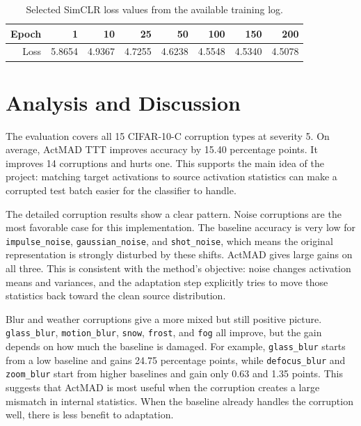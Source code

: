 \documentclass[a4paper,11pt]{article}
\begin{document}
\begin{table}[H]
\centering
\caption{Selected SimCLR loss values from the available training log.}
\begin{tabular}{rrrrrrrr}
\toprule
Epoch & 1 & 10 & 25 & 50 & 100 & 150 & 200\\
\midrule
Loss & 5.8654 & 4.9367 & 4.7255 & 4.6238 & 4.5548 & 4.5340 & 4.5078\\
\bottomrule
\end{tabular}
\end{table}

\section{Analysis and Discussion}

The evaluation covers all 15 CIFAR-10-C corruption types at severity 5. On average, ActMAD TTT improves accuracy by 15.40 percentage points. It improves 14 corruptions and hurts one. This supports the main idea of the project: matching target activations to source activation statistics can make a corrupted test batch easier for the classifier to handle.

The detailed corruption results show a clear pattern. Noise corruptions are the most favorable case for this implementation. The baseline accuracy is very low for \texttt{impulse\_noise}, \texttt{gaussian\_noise}, and \texttt{shot\_noise}, which means the original representation is strongly disturbed by these shifts. ActMAD gives large gains on all three. This is consistent with the method's objective: noise changes activation means and variances, and the adaptation step explicitly tries to move those statistics back toward the clean source distribution.

Blur and weather corruptions give a more mixed but still positive picture. \texttt{glass\_blur}, \texttt{motion\_blur}, \texttt{snow}, \texttt{frost}, and \texttt{fog} all improve, but the gain depends on how much the baseline is damaged. For example, \texttt{glass\_blur} starts from a low baseline and gains 24.75 percentage points, while \texttt{defocus\_blur} and \texttt{zoom\_blur} start from higher baselines and gain only 0.63 and 1.35 points. This suggests that ActMAD is most useful when the corruption creates a large mismatch in internal statistics. When the baseline already handles the corruption well, there is less benefit to adaptation.
\end{document}
